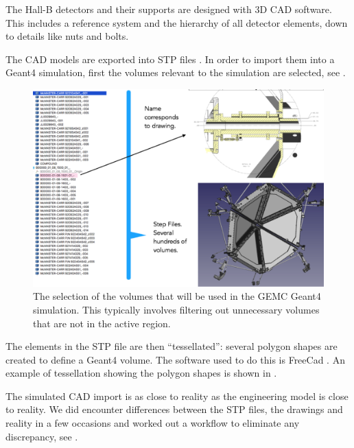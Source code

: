 The Hall-B detectors and their supports are designed with 3D CAD software. This includes a reference system and the
hierarchy of all detector elements, down to details like nuts and bolts.

The CAD models are exported into STP files \cite{stepFiles}.
In order to import them into a Geant4 simulation, first the volumes relevant to the simulation are selected, see .

\begin{figure}
	\centering
	\includegraphics[width=0.98\columnwidth,keepaspectratio]{img/cadSelection.png}
	\caption{The selection of the volumes that will be used in the GEMC Geant4 simulation.
             This typically involves filtering out unnecessary volumes that are not in the active region.}
	\label{fig:cadSelection}
\end{figure}

The elements in the STP file are then ``tessellated'': several polygon shapes are created to define a Geant4 volume.
The software used to do this is FreeCad \cite{freeCad}. An example of tessellation showing the polygon shapes
is shown in .

The simulated CAD import is as close to reality as the engineering model is close to reality.
We did encounter differences between the STP files, the drawings and reality in a few occasions and worked
out a workflow to eliminate any discrepancy, see .


